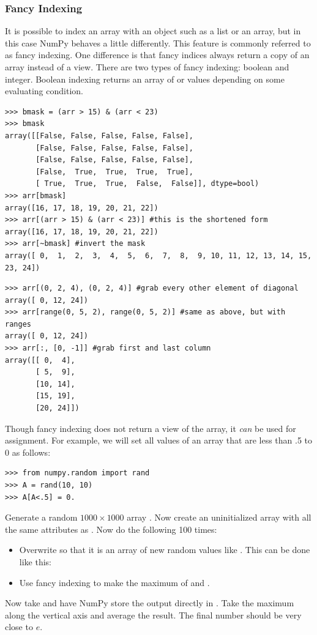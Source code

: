 \subsubsection*{Fancy Indexing}
It is possible to index an array with an object such as a list or an array, 
but in this case NumPy behaves a little differently.
This feature is commonly referred to as fancy indexing.
One difference is that fancy indices always return a copy of an array instead of a view.
There are two types of fancy indexing: boolean and integer.
Boolean indexing returns an array of  or  values depending on some 
evaluating condition.
\begin{lstlisting}
>>> bmask = (arr > 15) & (arr < 23)
>>> bmask
array([[False, False, False, False, False],
       [False, False, False, False, False],
       [False, False, False, False, False],
       [False,  True,  True,  True,  True],
       [ True,  True,  True,  False,  False]], dtype=bool)
>>> arr[bmask]
array([16, 17, 18, 19, 20, 21, 22])
>>> arr[(arr > 15) & (arr < 23)] #this is the shortened form
array([16, 17, 18, 19, 20, 21, 22])
>>> arr[~bmask] #invert the mask
array([ 0,  1,  2,  3,  4,  5,  6,  7,  8,  9, 10, 11, 12, 13, 14, 15, 23, 24])
\end{lstlisting}
\begin{lstlisting}
>>> arr[(0, 2, 4), (0, 2, 4)] #grab every other element of diagonal
array([ 0, 12, 24])
>>> arr[range(0, 5, 2), range(0, 5, 2)] #same as above, but with ranges
array([ 0, 12, 24])
>>> arr[:, [0, -1]] #grab first and last column
array([[ 0,  4],
       [ 5,  9],
       [10, 14],
       [15, 19],
       [20, 24]])
\end{lstlisting}

Though fancy indexing does not return a view of the array, it \emph{can} be used for assignment.
For example, we will set all values of an array that are less than .5 to 0 as follows:
\begin{lstlisting}
>>> from numpy.random import rand
>>> A = rand(10, 10)
>>> A[A<.5] = 0.
\end{lstlisting}

\begin{problem}
Generate a random $1000 \times 1000$ array .
Now create an uninitialized array  with all the same attributes as .
Now do the following 100 times:
\begin{itemize}
\item Overwrite  so that it is an array of new random values like .
This can be done like this: 
\item Use fancy indexing to make  the maximum of  and .
\end{itemize}
Now take  and have NumPy store the output directly in .
Take the maximum along the vertical axis and average the result.
The final number should be very close to $e$.
\end{problem}

